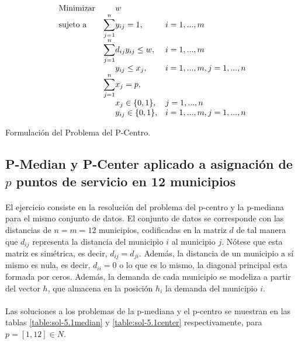 \documentclass[spanish]{article}
\begin{document}
		\begin{eqfloat}
			\begin{equation}
				\begin{array}{ll@{}ll}
					\text{Minimizar}
						& 																 		& w	&							\\
					\text{sujeto a}
						& \displaystyle\sum\limits_{j = 1}^n 	& y_{ij} = 1,		&i=1 ,..., m	\\
						& \displaystyle\sum\limits_{j = 1}^n 	& d_{ij}y_{ij} \leq w,  		& i=1 ,..., m \\
						& 																	 	& y_{ij} \leq x_{j},  		& i=1 ,..., m,j=1 ,..., n  \\
						& \displaystyle\sum\limits_{j = 1}^n 	& x_{j} = p,  		& 						\\
						&                                     &	x_{j} \in \{0,1\},&j=1 ,..., n 	\\
						&                                     &	y_{ij} \in \{0,1\},&i=1 ,..., m, j=1 ,..., n  \\
				\end{array}
			\end{equation}
			\caption{Formulación del Problema del P-Centro.}
      \label{eq:p_center}
    \end{eqfloat}


		\subsection{P-Median y P-Center aplicado a asignación de $p$ puntos de servicio en 12 municipios}
		\label{sec:5.1}

			\paragraph{}
			El ejercicio consiste en la resolución del problema del p-centro y la p-mediana para el mismo conjunto de datos. El conjunto de datos se corresponde con las distancias de $n = m = 12$ municipios, codificadas en la matriz $d$ de tal manera que $d_{ij}$ representa la distancia del municipio $i$ al municipio $j$. Nótese que esta matriz es simétrica, es decir, $d_{ij} = d_{ji}$. Además, la distancia de un municipio a sí mismo es nula, es decir, $d_{ii} = 0$ o lo que es lo mismo, la diagonal principal esta formada por ceros. Además, la demanda de cada municipio se modeliza a partir del vector $h$, que almacena en la posición $h_i$ la demanda del municipio $i$.

			\paragraph{}
			Las soluciones a los problemas de la p-mediana y el p-centro se muestran en las tablas \ref{table:sol-5.1median} y \ref{table:sol-5.1center} respectivamente, para $p = [1, 12] \in N$.
\end{document}
